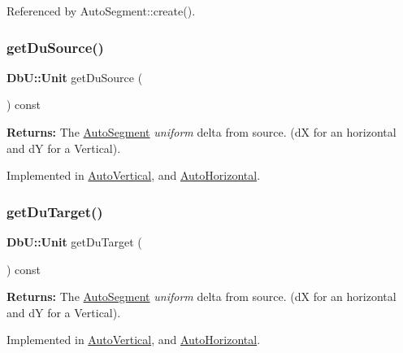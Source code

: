 Referenced by Auto\+Segment\+::create().

\mbox{\label{classKatabatic_1_1AutoSegment_ab4881df67bd8f036d0199ed6540fe774}} 
\subsubsection{\texorpdfstring{get\+Du\+Source()}{getDuSource()}}
{\footnotesize\ttfamily \textbf{ Db\+U\+::\+Unit} get\+Du\+Source (\begin{DoxyParamCaption}{ }\end{DoxyParamCaption}) const\hspace{0.3cm}{\ttfamily [pure virtual]}}

{\bfseries Returns\+:} The \hyperlink{classKatabatic_1_1AutoSegment}{Auto\+Segment} {\itshape uniform} delta from source. (dX for an horizontal and dY for a Vertical). 

Implemented in \hyperlink{classKatabatic_1_1AutoVertical_a760500b1fd027c71f5362dd8c0b01ea7}{Auto\+Vertical}, and \hyperlink{classKatabatic_1_1AutoHorizontal_a760500b1fd027c71f5362dd8c0b01ea7}{Auto\+Horizontal}.

\mbox{\label{classKatabatic_1_1AutoSegment_a0644d656eedc71dba2fb3c6c0d83ed3f}} 
\subsubsection{\texorpdfstring{get\+Du\+Target()}{getDuTarget()}}
{\footnotesize\ttfamily \textbf{ Db\+U\+::\+Unit} get\+Du\+Target (\begin{DoxyParamCaption}{ }\end{DoxyParamCaption}) const\hspace{0.3cm}{\ttfamily [pure virtual]}}

{\bfseries Returns\+:} The \hyperlink{classKatabatic_1_1AutoSegment}{Auto\+Segment} {\itshape uniform} delta from source. (dX for an horizontal and dY for a Vertical). 

Implemented in \hyperlink{classKatabatic_1_1AutoVertical_a76e349c14c904b3300a15caa1ee8b680}{Auto\+Vertical}, and \hyperlink{classKatabatic_1_1AutoHorizontal_a76e349c14c904b3300a15caa1ee8b680}{Auto\+Horizontal}.

